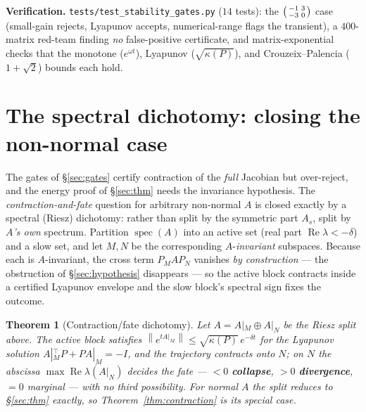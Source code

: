 \documentclass[11pt]{article}
\newtheorem{theorem}{Theorem}
\theoremstyle{definition}
\newcommand{\norm}[1]{\left\lVert#1\right\rVert}
\newcommand{\PM}{P_{\!M}}
\newcommand{\PN}{P_{\!N}}
\DeclareMathOperator*{\Real}{Re}
\DeclareMathOperator{\spec}{spec}
\begin{document}
\begin{verifybox}
\textbf{Verification.} \texttt{tests/test\_stability\_gates.py} ($14$ tests): the
$\begin{psmallmatrix}-1&3\\-3&0\end{psmallmatrix}$ case (small-gain rejects, Lyapunov
accepts, numerical-range flags the transient), a $400$-matrix red-team finding \emph{no}
false-positive certificate, and matrix-exponential checks that the monotone ($e^{\omega t}$),
Lyapunov ($\sqrt{\kappa(P)}$), and Crouzeix--Palencia ($1+\sqrt2$) bounds each hold.
\end{verifybox}

\section{The spectral dichotomy: closing the non-normal case}
\label{sec:dichotomy}
The gates of \S\ref{sec:gates} certify contraction of the \emph{full} Jacobian but
over-reject, and the energy proof of \S\ref{sec:thm} needs the invariance hypothesis. The
\emph{contraction-and-fate} question for arbitrary non-normal $A$ is closed exactly by a
spectral (Riesz) dichotomy: rather than split by the symmetric part $A_s$, split by
\emph{$A$'s own} spectrum. Partition $\spec(A)$ into an active set (real part
$\Real\lambda<-\delta$) and a slow set, and let $M,N$ be the corresponding
$A$-\emph{invariant} subspaces. Because each is $A$-invariant, the cross term
$\PM A\PN$ vanishes \emph{by construction} --- the obstruction of \S\ref{sec:hypothesis}
disappears --- so the active block contracts inside a certified Lyapunov envelope and the
slow block's spectral sign fixes the outcome.

\begin{theorem}[Contraction/fate dichotomy]
\label{thm:dichotomy}
Let $A=A|_M\oplus A|_N$ be the Riesz split above. The active block satisfies
$\norm{e^{tA|_M}}\le\sqrt{\kappa(P)}\,e^{-\delta t}$ for the Lyapunov solution
$A|_M^\top P+PA|_M=-I$, and the trajectory contracts onto $N$; on $N$ the abscissa
$\max\Real\lambda(A|_N)$ decides the fate --- $<0$ \textbf{collapse}, $>0$
\textbf{divergence}, $=0$ marginal --- with no third possibility. For normal $A$ the split
reduces to \S\ref{sec:thm} exactly, so Theorem~\ref{thm:contraction} is its special case.
\end{theorem}
\end{document}
